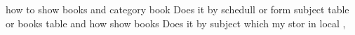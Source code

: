 how to show books and category book 
Does it by schedull or form subject table or books table
and how show books Does it by subject which my stor in local ,


